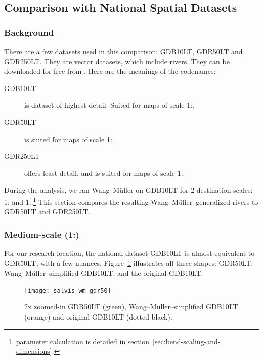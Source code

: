 \documentclass[a4paper]{article}
\newcommand{\WM}{Wang--M{\"u}ller}
\begin{document}
\subsection{Comparison with National Spatial Datasets}

\subsubsection{Background}

There are a few datasets used in this comparison: GDB10LT, GDR50LT and
GDR250LT. They are vector datasets, which include rivers. They can be
downloaded for free from \cite{nzt}. Here are the meanings of the codenames:

\begin{description}

    \item[GDB10LT] is dataset of highest detail. Suited for maps of scale
        1:.

    \item[GDR50LT] is suited for maps of scale 1:.

    \item[GDR250LT] offers least detail, and is suited for maps of
        scale 1:.

\end{description}

During the analysis, we ran {\WM} on GDB10LT for 2 destination scales:
1: and 1:.\footnote{parameter calculation is
detailed in section~\ref{sec:bend-scaling-and-dimensions}.} This section
compares the resulting {\WM}--generalized rivers to GDR50LT and GDR250LT.

\subsubsection{Medium-scale (1:)}

For our research location, the national dataset GDB10LT is almost equivalent to
GDR50LT, with a few nuances. Figure~\ref{fig:salvis-wm-gdr50} illustrates
all three shapes: GDR50LT, {\WM}--simplified GDB10LT, and the original GDB10LT.

\begin{figure}[h!]
    \centering
    \texttt{[image: salvis-wm-gdr50]}

    \caption{2x zoomed-in GDR50LT (green), {\WM}--simplified GDB10LT (orange)
    and original GDB10LT (dotted black).}

    \label{fig:salvis-wm-gdr50}
\end{figure}
\end{document}
